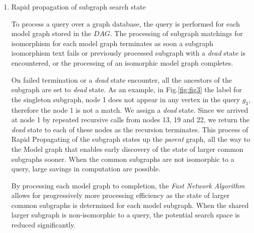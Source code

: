 \begin{enumerate}
\begin{enumerate}
\item{Rapid propagation of subgraph search state}

To process a query over a graph database, the query is performed for each model graph stored in the $DAG$. 
The processing of subgraph matchings for isomorphism for each model graph terminates as soon a subgraph isomorphism text fails or previously processed subgraph with a \textit{dead} state is encountered, or the processing of an isomorphic model graph completes. 


On failed termination or a \textit{dead} state encounter, all the ancestors of the subgraph are set to \textit{dead} state. 
As an example, in Fig.\ref{fig:fig3} the label for the singleton subgraph, node 1 does not appear in any vertex in the query $g_3$, therefore the node 1 is not a match. 
We assign a \textit{dead} state. Since we arrived at node 1 by repeated recursive calls from nodes 13, 19 and 22, we return the \textit{dead} state to each of these nodes as the recursion terminates. 
This process of Rapid Propagating of the subgraph states up the \textit{parent} graph, all the way to the Model graph that enables early discovery of the state of larger common subgraphs sooner. When the common subgraphs are not isomorphic to a query, large savings in computation are possible.

By processing each model graph to completion, the \textit{Fast Network Algorithm} allows for progressively more processing efficiency as the state of larger common subgraphs is determined for each model subgraph. When the shared larger subgraph is non-isomorphic to a query, the potential search space is reduced significantly.





\end{enumerate}
\end{enumerate}
